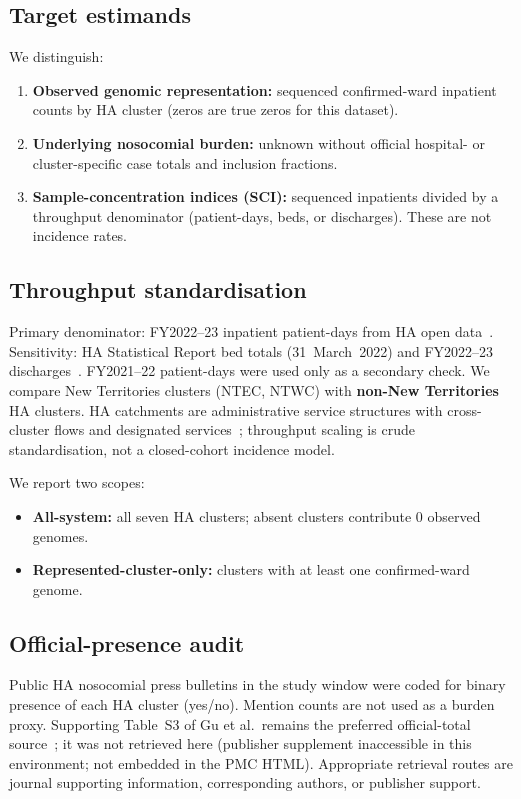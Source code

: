 \documentclass[11pt]{article}
\begin{document}
\subsection{Target estimands}
We distinguish:
\begin{enumerate}
  \item \textbf{Observed genomic representation:} sequenced confirmed-ward inpatient counts by HA cluster (zeros are true zeros for this dataset).
  \item \textbf{Underlying nosocomial burden:} unknown without official hospital- or cluster-specific case totals and inclusion fractions.
  \item \textbf{Sample-concentration indices (SCI):} sequenced inpatients divided by a throughput denominator (patient-days, beds, or discharges). These are not incidence rates.
\end{enumerate}

\subsection{Throughput standardisation}
Primary denominator: FY2022--23 inpatient patient-days from HA open data~\cite{ha_opendata}.
Sensitivity: HA Statistical Report bed totals (31~March~2022) and FY2022--23 discharges~\cite{ha_opendata}.
FY2021--22 patient-days were used only as a secondary check.
We compare New Territories clusters (NTEC, NTWC) with \textbf{non-New Territories} HA clusters.
HA catchments are administrative service structures with cross-cluster flows and designated services~\cite{legco2017}; throughput scaling is crude standardisation, not a closed-cohort incidence model.

We report two scopes:
\begin{itemize}
  \item \textbf{All-system:} all seven HA clusters; absent clusters contribute 0 observed genomes.
  \item \textbf{Represented-cluster-only:} clusters with at least one confirmed-ward genome.
\end{itemize}

\subsection{Official-presence audit}
Public HA nosocomial press bulletins in the study window were coded for binary presence of each HA cluster (yes/no).
Mention counts are not used as a burden proxy.
Supporting Table~S3 of Gu et al.\ remains the preferred official-total source~\cite{gu2026hai}; it was not retrieved here (publisher supplement inaccessible in this environment; not embedded in the PMC HTML).
Appropriate retrieval routes are journal supporting information, corresponding authors, or publisher support.
\end{document}
